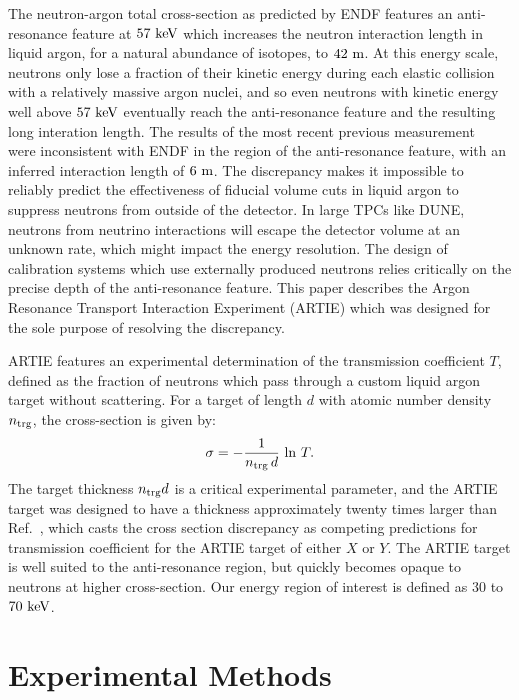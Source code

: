 \documentclass[%
 reprint,
superscriptaddress,
 preprintnumbers,
 nofootinbib,
 nobibnotes,
 bibnotes,
 amsmath,amssymb,
 aps,
 prl, 
 floatfix,
]{revtex4-1}
\newcommand{\keV}{\mathrm{ke\kern -0.1em V}}
\begin{document}
The neutron-argon total cross-section as predicted by ENDF features an
anti-resonance feature at $57~\keV$ which increases the neutron
interaction length in liquid argon, for a natural abundance of
isotopes, to $42~\rm m$.  At this energy scale, neutrons only lose a
fraction of their kinetic energy during each elastic collision with a
relatively massive argon nuclei, and so even neutrons with kinetic
energy well above $57~\rm keV$ eventually reach the anti-resonance
feature and the resulting long interation length.  The results of the
most recent previous measurement~\cite{Winters:1991} were inconsistent
with ENDF in the region of the anti-resonance feature, with an
inferred interaction length of $6~\rm m$.  The discrepancy makes it
impossible to reliably predict the effectiveness of fiducial volume
cuts in liquid argon to suppress neutrons from outside of the
detector.  In large TPCs like DUNE, neutrons from neutrino
interactions will escape the detector volume at an unknown rate, which
might impact the energy resolution.  The design of calibration systems
which use externally produced neutrons relies critically on the
precise depth of the anti-resonance feature.  This paper describes the
Argon Resonance Transport Interaction Experiment (ARTIE) which was
designed for the sole purpose of resolving the discrepancy.

ARTIE features an experimental determination of the transmission
coefficient $T$, defined as the fraction of neutrons which pass
through a custom liquid argon target without scattering.  For a
target of length $d$ with atomic number density $n_{\rm trg}$, the
cross-section is given by:
\begin{equation}
  \sigma = -\frac{1}{n_{\rm trg} \, d} \, \ln \, T.
\label{eq:sigma}
\end{equation}
The target thickness $n_{\rm trg} d$ is a critical experimental
parameter, and the ARTIE target was designed to have a thickness
approximately twenty times larger than Ref.~\cite{Winters:1991}, which
casts the cross section discrepancy as competing predictions for
transmission coefficient for the ARTIE target of either
{\color{red} $X$ or $Y$}.
The ARTIE target is well suited to the anti-resonance region, but
quickly becomes opaque to neutrons at higher cross-section.  Our
energy region of interest is defined as $30$ to $70~\rm keV$.

\section{\label{sec:setup}Experimental Methods}
\end{document}
